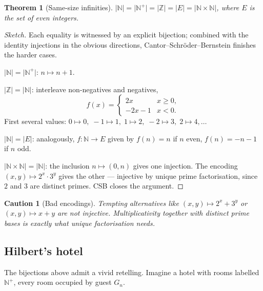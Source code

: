 \documentclass[11pt]{article}
\theoremstyle{defstyle}
\theoremstyle{thmstyle}
\newtheorem{theorem}{Theorem}[section]
\theoremstyle{notstyle}
\theoremstyle{cautionstyle}
\newtheorem*{caution}{Caution}
\newcommand{\Z}{\mathbb{Z}}
\newcommand{\N}{\mathbb{N}}
\newcommand{\Np}{\mathbb{N}^{+}}
\newcommand{\card}[1]{\lvert #1 \rvert}
\begin{document}
\begin{thmbox}
\begin{theorem}[Same-size infinities]
$\card{\N} = \card{\Np} = \card{\Z} = \card{E} = \card{\N \times \N}$,
where $E$ is the set of even integers.
\end{theorem}
\begin{proof}[Sketch]
Each equality is witnessed by an explicit bijection; combined with the
identity injections in the obvious directions, Cantor--Schröder--Bernstein
finishes the harder cases.

\smallskip
\noindent$\card{\N} = \card{\Np}$:\; $n \mapsto n + 1$.

\smallskip
\noindent$\card{\Z} = \card{\N}$:\; interleave non-negatives and negatives,
\[
  f(x) = \begin{cases} 2x & x \geq 0, \\ -2x - 1 & x < 0. \end{cases}
\]
First several values: $0 \mapsto 0,\; -1 \mapsto 1,\; 1 \mapsto 2,\;
-2 \mapsto 3,\; 2 \mapsto 4, \ldots$

\smallskip
\noindent$\card{\N} = \card{E}$:\; analogously, $f \colon \N \to E$ given by
$f(n) = n$ if $n$ even, $f(n) = -n - 1$ if $n$ odd.

\smallskip
\noindent$\card{\N \times \N} = \card{\N}$:\; the inclusion $n \mapsto (0, n)$
gives one injection.  The encoding $(x, y) \mapsto 2^x \cdot 3^y$ gives
the other --- injective by unique prime factorisation, since $2$ and $3$
are distinct primes.  CSB closes the argument.
\end{proof}
\end{thmbox}

\begin{cautionbox}
\begin{caution}[Bad encodings]
Tempting alternatives like $(x,y) \mapsto 2^x + 3^y$ or
$(x,y) \mapsto x + y$ are \emph{not} injective.  Multiplicativity together
with distinct prime bases is exactly what unique factorisation needs.
\end{caution}
\end{cautionbox}

\subsection{Hilbert's hotel}

The bijections above admit a vivid retelling.  Imagine a hotel with rooms
labelled $\Np$, every room occupied by guest $G_n$.
\end{document}
